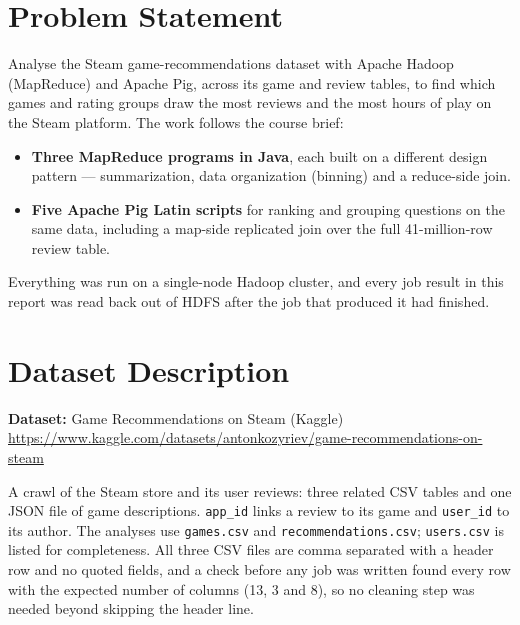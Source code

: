 \documentclass[11pt,a4paper]{article}
\newcommand{\code}[1]{\texttt{#1}}
\begin{document}


\tableofcontents
\thispagestyle{fancy}
\newpage

\section{Problem Statement}

Analyse the Steam game-recommendations dataset with Apache Hadoop (MapReduce) and Apache Pig,
across its game and review tables, to find which games and rating groups draw the most reviews and
the most hours of play on the Steam platform. The work follows the course brief:

\begin{itemize}
  \item \textbf{Three MapReduce programs in Java}, each built on a different design pattern —
        summarization, data organization (binning) and a reduce-side join.
  \item \textbf{Five Apache Pig Latin scripts} for ranking and grouping questions on the same data,
        including a map-side replicated join over the full 41-million-row review table.
\end{itemize}

Everything was run on a single-node Hadoop cluster, and every job result in this report was read back
out of HDFS after the job that produced it had finished.

\section{Dataset Description}

\textbf{Dataset:} Game Recommendations on Steam (Kaggle)\\
\url{https://www.kaggle.com/datasets/antonkozyriev/game-recommendations-on-steam}

A crawl of the Steam store and its user reviews: three related CSV tables and one JSON file of game
descriptions. \code{app\_id} links a review to its game and \code{user\_id} to its author. The
analyses use \code{games.csv} and \code{recommendations.csv}; \code{users.csv} is listed for
completeness. All three CSV files are comma separated with a header row and no quoted fields, and a
check before any job was written found every row with the expected number of columns (13, 3 and 8),
so no cleaning step was needed beyond skipping the header line.
\end{document}
